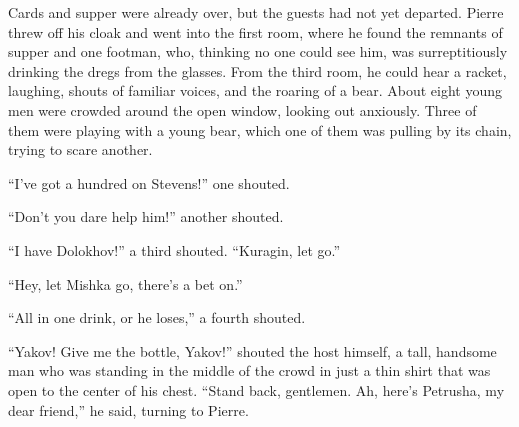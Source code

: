 Cards and supper were already over, but the guests had not yet departed. Pierre threw off his cloak and went into the first room, where he found the remnants of supper and one footman, who, thinking no one could see him, was surreptitiously drinking the dregs from the glasses. From the third room, he could hear a racket, laughing, shouts of familiar voices, and the roaring of a bear. About eight young men were crowded around the open window, looking out anxiously. Three of them were playing with a young bear, which one of them was pulling by its chain, trying to scare another.

``I've got a hundred on Stevens!'' one shouted.

``Don't you dare help him!'' another shouted.

``I have Dolokhov!'' a third shouted. ``Kuragin, let go.''

``Hey, let Mishka go, there's a bet on.''

``All in one drink, or he loses,'' a fourth shouted.

``Yakov! Give me the bottle, Yakov!'' shouted the host himself, a tall, handsome man who was standing in the middle of the crowd in just a thin shirt that was open to the center of his chest. ``Stand back, gentlemen. Ah, here's Petrusha, my dear friend,'' he said, turning to Pierre. %

